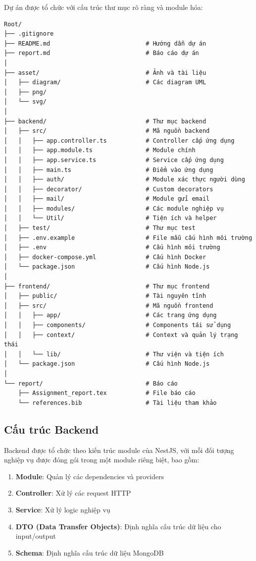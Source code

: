 \documentclass[a4paper]{article}
\begin{document}
Dự án được tổ chức với cấu trúc thư mục rõ ràng và module hóa:

\begin{verbatim}
Root/
├── .gitignore 
├── README.md                           # Hướng dẫn dự án
├── report.md                           # Báo cáo dự án
│
├── asset/                              # Ảnh và tài liệu
│   ├── diagram/                        # Các diagram UML
│   ├── png/
│   └── svg/
│
├── backend/                            # Thư mục backend
│   ├── src/                            # Mã nguồn backend
│   │   ├── app.controller.ts           # Controller cấp ứng dụng
│   │   ├── app.module.ts               # Module chính
│   │   ├── app.service.ts              # Service cấp ứng dụng
│   │   ├── main.ts                     # Điểm vào ứng dụng
│   │   ├── auth/                       # Module xác thực người dùng
│   │   ├── decorator/                  # Custom decorators
│   │   ├── mail/                       # Module gửi email
│   │   ├── modules/                    # Các module nghiệp vụ
│   │   └── Util/                       # Tiện ích và helper
│   ├── test/                           # Thư mục test
│   ├── .env.example                    # File mẫu cấu hình môi trường
│   ├── .env                            # Cấu hình môi trường
│   ├── docker-compose.yml              # Cấu hình Docker
│   └── package.json                    # Cấu hình Node.js
│
├── frontend/                           # Thư mục frontend
│   ├── public/                         # Tài nguyên tĩnh
│   ├── src/                            # Mã nguồn frontend
│   │   ├── app/                        # Các trang ứng dụng
│   │   ├── components/                 # Components tái sử dụng
│   │   ├── context/                    # Context và quản lý trạng thái
│   │   └── lib/                        # Thư viện và tiện ích
│   └── package.json                    # Cấu hình Node.js
│
└── report/                             # Báo cáo
    ├── Assignment_report.tex           # File báo cáo
    └── references.bib                  # Tài liệu tham khảo
\end{verbatim}

\subsection{Cấu trúc Backend}

Backend được tổ chức theo kiến trúc module của NestJS, với mỗi đối tượng nghiệp vụ được đóng gói trong một module riêng biệt, bao gồm:

\begin{enumerate}
    \item \textbf{Module}: Quản lý các dependencies và providers
    \item \textbf{Controller}: Xử lý các request HTTP
    \item \textbf{Service}: Xử lý logic nghiệp vụ
    \item \textbf{DTO (Data Transfer Objects)}: Định nghĩa cấu trúc dữ liệu cho input/output
    \item \textbf{Schema}: Định nghĩa cấu trúc dữ liệu MongoDB
\end{enumerate}
\end{document}
